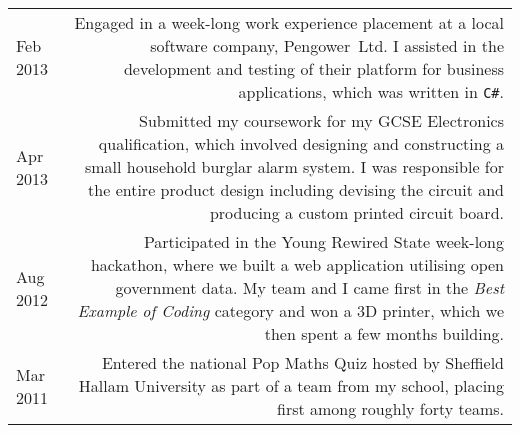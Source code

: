 \begin{longtable}{L!{\sep}R}
    Feb 2013 &
    Engaged in a week-long work experience placement at a local software company, \mbox{Pengower Ltd}. I assisted in the development and testing of their platform for business applications, which was written in \texttt{C\#}.
    \vspace{1.2em} \\

    Apr 2013 &
    Submitted my coursework for my GCSE Electronics qualification, which involved designing and constructing a small household burglar alarm system. I was responsible for the entire product design including devising the circuit and producing a custom printed circuit board.
    \vspace{1.2em} \\

    Aug 2012 &
    Participated in the Young Rewired State week-long hackathon, where we built a web application utilising open government data. My team and I came first in the \emph{Best Example of Coding} category and won a 3D printer, which we then spent a few months building.
    \vspace{1.2em} \\


    Mar 2011 &
    Entered the national Pop Maths Quiz hosted by Sheffield Hallam University as part of a team from my school, placing first among roughly forty teams.
    \\
\end{longtable}

\vspace{.2em}
